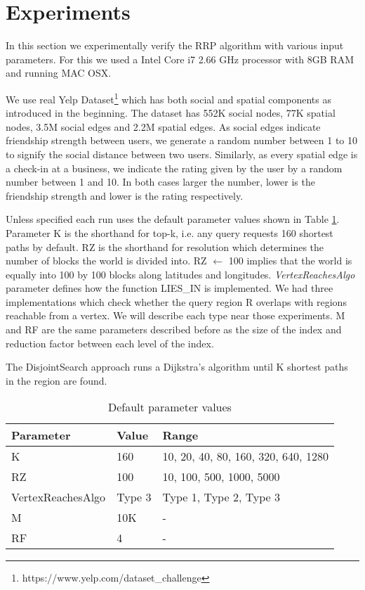 \section{Experiments}
In this section we experimentally verify the RRP algorithm with various input parameters. For this we used a Intel Core i7 2.66 GHz processor with 8GB RAM and running MAC OSX. 

We use real Yelp Dataset\footnote{https://www.yelp.com/dataset\_challenge} which has both social and spatial components as introduced in the beginning. The dataset has 552K social nodes, 77K spatial nodes, 3.5M social edges and 2.2M spatial edges. As social edges indicate friendship strength between users, we generate a random number between 1 to 10 to signify the social distance between two users. Similarly, as every spatial edge is a check-in at a business, we indicate the rating given by the user by a random number between 1 and 10. In both cases larger the number, lower is the friendship strength and lower is the rating respectively. 

Unless specified each run uses the default parameter values shown in Table \ref{tab:default-param}. Parameter K is the shorthand for top-k, i.e. any query requests 160 shortest paths by default. RZ is the shorthand for resolution which determines the number of blocks the world is divided into. RZ $\gets$ 100 implies that the world is equally into 100 by 100 blocks along latitudes and longitudes. \textit{VertexReachesAlgo} parameter defines how the function LIES\_IN is implemented. We had three implementations which check whether the query region R overlaps with regions reachable from a vertex. We will describe each type near those experiments. M and RF are the same parameters described before as the size of the index and reduction factor between each level of the index.

The DisjointSearch approach runs a Dijkstra's algorithm until K shortest paths in the region are found.

\begin{table}[h]
	\caption{Default parameter values}
	\label{tab:default-param}
	\begin{center}
		\renewcommand{\arraystretch}{1.25}
		\begin{tabular}{ l | l | l }
			\hline
			Parameter & Value & Range \\ \hline
			\hline
			K & 160 & 10, 20, 40, 80, 160, 320, 640, 1280 \\
			RZ & 100 & 10, 100, 500, 1000, 5000 \\
			VertexReachesAlgo & Type 3 & Type 1, Type 2, Type 3 \\
			M & 10K & - \\
			RF & 4 & - \\
			\hline
		\end{tabular}
	\end{center}
\end{table}

